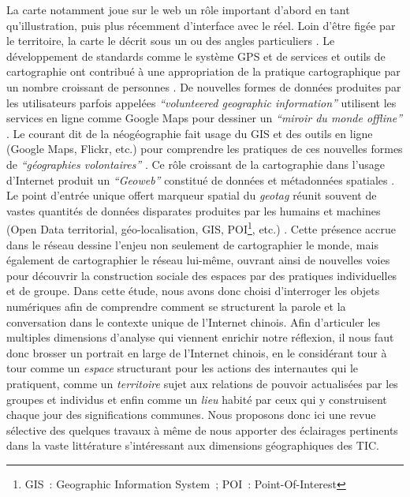 La carte notamment joue sur le web un rôle important d’abord en tant qu’illustration, puis plus récemment d’interface avec le réel. Loin d’être figée par le territoire, la carte le décrit sous un ou des angles particuliers \citep{Brunet1987, Jacob1992}. Le développement de standards comme le système GPS \citep{Haklay2008} et de services et outils de cartographie ont contribué à une appropriation de la pratique cartographique par un nombre croissant de personnes \citep{Crampton2009}. De nouvelles formes de données produites par les utilisateurs parfois appelées \textit{``volunteered geographic information''} \citep{Elwood2008} utilisent les services en ligne comme Google Maps pour dessiner un \textit{``miroir du monde offline''} \citep{Graham2011}. Le courant dit de la néogéographie fait usage du GIS et des outils en ligne (Google Maps, Flickr, etc.) pour comprendre les pratiques de ces nouvelles formes de \textit{``géographies volontaires''} \citep{Turner2006}. Ce rôle croissant de la cartographie dans l’usage d’Internet produit un \textit{``Geoweb''} constitué de données et métadonnées spatiales \citep{Crampton2009}. Le point d'entrée unique offert marqueur spatial du \textit{geotag} réunit souvent de vastes quantités de données disparates produites par les humains et machines (Open Data territorial, géo-localisation, GIS, POI\footnote{GIS : Geographic Information System ; POI : Point-Of-Interest}, etc.) \citep{Torrens2010}. Cette présence accrue dans le réseau dessine l’enjeu non seulement de cartographier le monde, mais également de cartographier le réseau lui-même, ouvrant ainsi de nouvelles voies pour découvrir la construction sociale des espaces par des pratiques individuelles et de groupe. Dans cette étude, nous avons donc choisi d’interroger les objets numériques afin de comprendre comment se structurent la parole et la conversation dans le contexte unique de l’Internet chinois. Afin d’articuler les multiples dimensions d’analyse qui viennent enrichir notre réflexion, il nous faut donc brosser un portrait en large de l’Internet chinois, en le considérant tour à tour comme un \textit{espace} structurant pour les actions des internautes qui le pratiquent, comme un \textit{territoire} sujet aux relations de pouvoir actualisées par les groupes et individus et enfin comme un \textit{lieu} habité par ceux qui y construisent chaque jour des significations communes. Nous proposons donc ici une revue sélective des quelques travaux à même de nous apporter des éclairages pertinents dans la vaste littérature s’intéressant aux dimensions géographiques des TIC.

